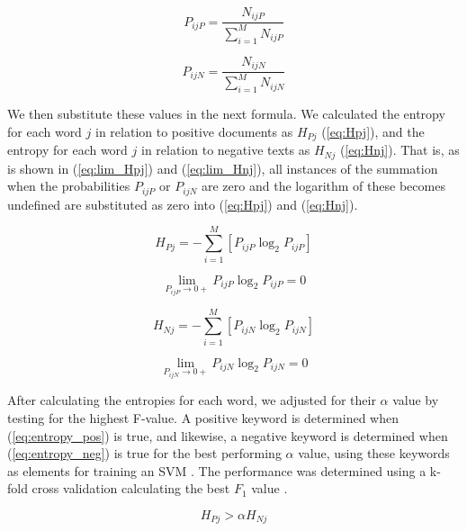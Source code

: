 \documentclass[review]{elsarticle}
\begin{document}
\begin{equation}\label{eq:PijP}
P_{ijP} = \frac{N_{ijP}}{\sum_{i=1}^M N_{ijP}}
\end{equation}

\begin{equation}\label{eq:PijN}
P_{ijN} = \frac{N_{ijN}}{\sum_{i=1}^M N_{ijN}}
\end{equation}

We then substitute these values in the next formula. We calculated the entropy for each word \(j\) in relation to positive documents as \(H_{Pj}\) (\ref{eq:Hpj}), and the entropy for each word \(j\) in relation to negative texts as \(H_{Nj}\) (\ref{eq:Hnj}). That is, as is shown in (\ref{eq:lim_Hpj}) and (\ref{eq:lim_Hnj}), all instances of the summation when the probabilities \(P_{ijP}\) or \(P_{ijN}\) are zero and the logarithm of these becomes undefined are substituted as zero into (\ref{eq:Hpj}) and (\ref{eq:Hnj}).

\begin{equation}\label{eq:Hpj}
H_{Pj} = - \sum_{i=1}^M [P_{ijP}\log_2 P_{ijP}]
\end{equation}

\begin{equation}\label{eq:lim_Hpj}
\lim_{P_{ijP}\to0+} P_{ijP}\log_2 P_{ijP} = 0
\end{equation}

\begin{equation}\label{eq:Hnj}
H_{Nj} = - \sum_{i=1}^M [P_{ijN}\log_2 P_{ijN}]
\end{equation}

\begin{equation}\label{eq:lim_Hnj}
\lim_{P_{ijN}\to0+} P_{ijN}\log_2 P_{ijN} = 0
\end{equation}

After calculating the entropies for each word, we adjusted for their \(\alpha\) value by testing for the highest F-value. A positive keyword is determined when (\ref{eq:entropy_pos}) is true, and likewise, a negative keyword is determined when (\ref{eq:entropy_neg}) is true for the best performing \(\alpha\) value, using these keywords as elements for training an SVM \cite[][]{cortes1995}. The performance was determined using a k-fold cross validation calculating the best \(F_1\) value \cite[][]{powers2011}.

\begin{equation}\label{eq:entropy_pos}
H_{Pj} > \alpha H_{Nj}
\end{equation}
\end{document}
